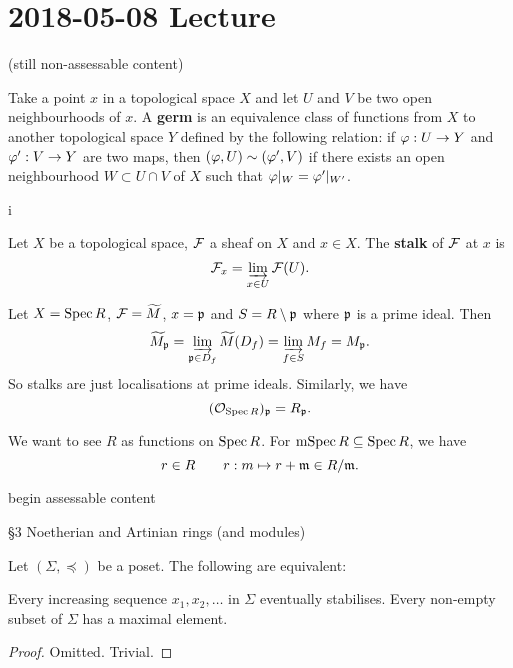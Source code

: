 \section{2018-05-08 Lecture}

(still non-assessable content)

\begin{defn}
  Take a point $x$ in a topological space $X$ and let $U$ and $V$ be two open neighbourhoods of $x$.
A \textbf{germ} is an equivalence class of functions from $X$ to another topological space $Y$ defined by the following relation: if $\varphi: U \to Y$ and $\varphi': V \to Y$ are two maps, then $(\varphi,U) \sim (\varphi',V)$ if there exists an open neighbourhood $W \subset U \cap V$ of $X$ such that $\varphi|_W = \varphi'|_{W'}$.
\end{defn}i

\begin{defn}[AG.11]
  Let $X$ be a topological space, $\mathcal{F}$ a sheaf on $X$ and $x \in X$.
  The \textbf{stalk} of $\mathcal{F}$ at $x$ is
  \[ \mathcal{F}_x = \varinjlim_{x \in U} \mathcal{F}(U). \]
\end{defn}

\begin{exam}
  Let $X = \operatorname{Spec} R$, $\mathcal{F} = \widetilde M$, $x = \mathfrak{p}$ and $S = R \setminus \mathfrak{p}$  where $\mathfrak{p}$ is a prime ideal.
  Then
  \[ \widetilde M_{\mathfrak{p}} = \varinjlim_{\mathfrak{p} \in D_f} \widetilde M(D_f) = \varinjlim_{f \in S} M_f = M_{\mathfrak{p}}. \]
  So stalks are just localisations at prime ideals.
  Similarly, we have
  \[ (\mathcal{O}_{\operatorname{Spec} R})_{\mathfrak{p}} = R_{\mathfrak{p}}. \]
\end{exam}

We want to see $R$ as functions on $\operatorname{Spec} R$.
For $\operatorname{mSpec} R \subseteq \operatorname{Spec} R$, we have
\[ r \in R \qquad r: m \mapsto r + \mathfrak{m} \in R/\mathfrak{m}. \]

begin assessable content

\S 3 Noetherian and Artinian rings (and modules)

\begin{lem}[3.1]\label{18:cond}
  Let $(\Sigma, \preceq)$ be a poset.
  The following are equivalent:
  \begin{enum}
    \io\label{18:acc} Every increasing sequence $x_1,x_2,\ldots$ in $\Sigma$ eventually stabilises.
    \io\label{18:max} Every non-empty subset of $\Sigma$ has a maximal element.
  \end{enum}
\end{lem}

\begin{proof}
  Omitted. Trivial.
\end{proof}

